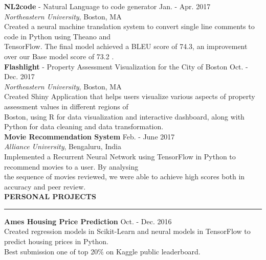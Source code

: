 \documentclass[a4paper]{article}
\newcommand{\myline}{\par
  \kern2pt %
  \hrule height 0.5pt
  \kern2pt %
}
\newcommand{\mybullet}{
	\indent \textbullet \hspace*{2mm}
}
\begin{document}
			\noindent
			\textbf{NL2code} - Natural Language to code generator
			\hfill Jan. - Apr. 2017 \\
			\textit{Northeastern University}, Boston, MA \\
			\mybullet Created a neural machine translation system to convert single line comments 
			to code in Python using Theano and \\ 
			\hspace*{9mm} TensorFlow. The final model achieved a BLEU score of 74.3, an improvement 
			over our Base model score of 73.2 . \\

			\noindent
			\textbf{Flashlight} - Property Assessment Visualization for the City of Boston 
			\hfill Oct. - Dec. 2017 \\
			\textit{Northeastern University}, Boston, MA \\
			\mybullet Created Shiny Application that helps users visualize various aspects of 
			property assessment values in different regions of \\ \hspace*{9mm} Boston, using 
			R for data visualization and interactive dashboard, along with Python for data cleaning 
			and data transformation. \\
			
			\noindent
			\textbf{Movie Recommendation System} \hfill Feb. - June 2017\\
			\textit{Alliance University}, Bengaluru, India \\
			\mybullet Implemented a Recurrent Neural Network using TensorFlow in Python to recommend 
      movies to a user. By analysing \\ \hspace*{9mm} the sequence of movies reviewed, we were 
      able to achieve high scores both in accuracy and peer review. \\ 

	\noindent
	{\large \textbf{PERSONAL PROJECTS}}
	\myline 
	\smallskip
	
		\noindent
		\textbf{Ames Housing Price Prediction} \hfill Oct. - Dec. 2016 \\
    \mybullet Created regression models in Scikit-Learn and neural models in TensorFlow to 
    predict housing prices in Python. \\
    \mybullet Best submission one of top 20\% on Kaggle public leaderboard. \\
		
	
\end{document}
